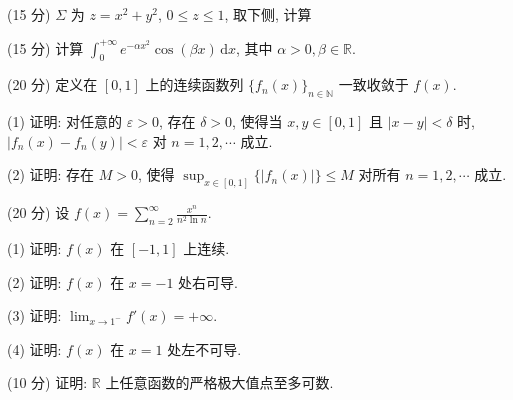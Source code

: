 (15 分) $\Sigma$ 为 $z = x^{2} + y^{2}$, $0 \leq z \leq 1$, 取下侧, 计算\par
\nopagebreak[4]
\par{}
(15 分) 计算 $\int_{0}^{+\infty} e^{-\alpha x^2} \cos(\beta x) \, \mathrm{d}x$, 其中 $\alpha > 0, \beta \in \mathbb{R}$.\par
\par{}
(20 分) 定义在 $[0,1]$ 上的连续函数列 $\{f_n(x)\}_{n\in \mathbb{N}}$ 一致收敛于 $f(x)$.\par
(1) 证明: 对任意的 $\varepsilon > 0$, 存在 $\delta > 0$, 使得当 $x, y \in [0,1]$ 且 $|x - y| < \delta$ 时, $|f_n(x) - f_n(y)| < \varepsilon$ 对 $n = 1,2,\cdots$ 成立.\par
(2) 证明: 存在 $M > 0$, 使得 $\sup_{x \in [0,1]} \{|f_n(x)|\} \leq M$ 对所有 $n = 1,2,\cdots$ 成立.\par
\par{}
(20 分) 设 $f(x) = \sum_{n=2}^{\infty} \frac{x^n}{n^2 \ln n}$.\par
(1) 证明: $f(x)$ 在 $[-1, 1]$ 上连续.\par
(2) 证明: $f(x)$ 在 $x = -1$ 处右可导.\par
(3) 证明: $\lim_{x \to 1^{-}} f'(x) = +\infty$.\par
(4) 证明: $f(x)$ 在 $x = 1$ 处左不可导.\par
\par{}
(10 分) 证明: $\mathbb{R}$ 上任意函数的严格极大值点至多可数.\par

